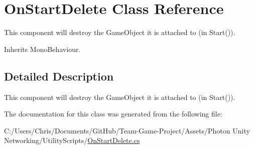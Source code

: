 \hypertarget{class_on_start_delete}{}\section{On\+Start\+Delete Class Reference}
\label{class_on_start_delete}


This component will destroy the Game\+Object it is attached to (in Start()). 




Inherits Mono\+Behaviour.



\subsection{Detailed Description}
This component will destroy the Game\+Object it is attached to (in Start()).



The documentation for this class was generated from the following file\+:\begin{DoxyCompactItemize}
\item 
C\+:/\+Users/\+Chris/\+Documents/\+Git\+Hub/\+Team-\/\+Game-\/\+Project/\+Assets/\+Photon Unity Networking/\+Utility\+Scripts/\hyperlink{_on_start_delete_8cs}{On\+Start\+Delete.\+cs}\end{DoxyCompactItemize}
